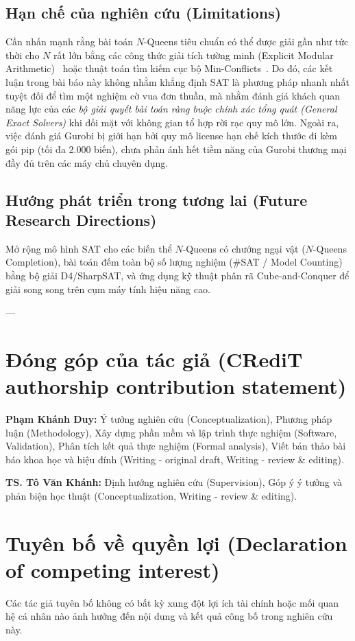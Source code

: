 \documentclass[a4paper,fleqn]{cas-sc}
\begin{document}
\subsection{Hạn chế của nghiên cứu (Limitations)}
Cần nhấn mạnh rằng bài toán $N$-Queens tiêu chuẩn có thể được giải gần như tức thời cho $N$ rất lớn bằng các công thức giải tích tường minh (Explicit Modular Arithmetic)~\cite{bell2009survey} hoặc thuật toán tìm kiếm cục bộ Min-Conflicts~\cite{minton1992solving}. Do đó, các kết luận trong bài báo này không nhằm khẳng định SAT là phương pháp nhanh nhất tuyệt đối để tìm một nghiệm cờ vua đơn thuần, mà nhằm đánh giá khách quan năng lực của các \textit{bộ giải quyết bài toán ràng buộc chính xác tổng quát (General Exact Solvers)} khi đối mặt với không gian tổ hợp rời rạc quy mô lớn. Ngoài ra, việc đánh giá Gurobi bị giới hạn bởi quy mô license hạn chế kích thước đi kèm gói pip (tối đa 2.000 biến), chưa phản ánh hết tiềm năng của Gurobi thương mại đầy đủ trên các máy chủ chuyên dụng.

\subsection{Hướng phát triển trong tương lai (Future Research Directions)}
Mở rộng mô hình SAT cho các biến thể $N$-Queens có chướng ngại vật ($N$-Queens Completion), bài toán đếm toàn bộ số lượng nghiệm (\#SAT / Model Counting) bằng bộ giải D4/SharpSAT, và ứng dụng kỹ thuật phân rã Cube-and-Conquer để giải song song trên cụm máy tính hiệu năng cao.

---

\section*{Đóng góp của tác giả (CRediT authorship contribution statement)}
\textbf{Phạm Khánh Duy:} Ý tưởng nghiên cứu (Conceptualization), Phương pháp luận (Methodology), Xây dựng phần mềm và lập trình thực nghiệm (Software, Validation), Phân tích kết quả thực nghiệm (Formal analysis), Viết bản thảo bài báo khoa học và hiệu đính (Writing - original draft, Writing - review \& editing).

\textbf{TS. Tô Văn Khánh:} Định hướng nghiên cứu (Supervision), Góp ý ý tưởng và phản biện học thuật (Conceptualization, Writing - review \& editing).

\section*{Tuyên bố về quyền lợi (Declaration of competing interest)}
Các tác giả tuyên bố không có bất kỳ xung đột lợi ích tài chính hoặc mối quan hệ cá nhân nào ảnh hưởng đến nội dung và kết quả công bố trong nghiên cứu này.
\end{document}
